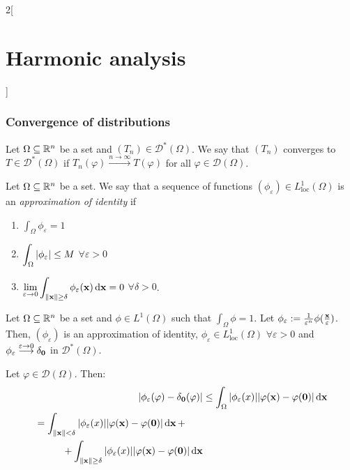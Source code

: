 \documentclass[../../../main_math.tex]{subfiles}
\begin{document}
\begin{multicols}{2}[\section{Harmonic analysis}]
  \subsubsection{Convergence of distributions}
  \begin{definition}
    Let $\Omega\subseteq \mathbb{R}^n$ be a set and $(T_n)\in \mathcal{D}^*(\Omega)$. We say that $(T_n)$ converges to $T\in\mathcal{D}^*(\Omega)$ if $T_n(\varphi)\overset{n\to\infty}{\longrightarrow}T(\varphi)$ for all $\varphi\in\mathcal{D}(\Omega)$.
  \end{definition}
  \begin{definition}
    Let $\Omega\subseteq \mathbb{R}^n$ be a set. We say that a sequence of functions $(\phi_\varepsilon)\in L_\mathrm{loc}^1(\Omega)$ is an \emph{approximation of identity} if
    \begin{enumerate}
      \item $\displaystyle\int_\Omega \phi_\varepsilon=1$
      \item $\displaystyle\int_\Omega \abs{\phi_\varepsilon}\leq M$ $\forall \varepsilon>0$
      \item $\displaystyle\lim_{\varepsilon\to 0}\int_{\left\|\boldsymbol{\mathrm{x}}\right\|\geq \delta}\phi_\varepsilon(\boldsymbol{\mathrm{x}})\dd{\boldsymbol{\mathrm{x}}}=0$ $\forall \delta>0$.
    \end{enumerate}
  \end{definition}
  \begin{proposition}
    Let $\Omega\subseteq \mathbb{R}^n$ be a set and $\phi\in L^1(\Omega)$ such that $\int_\Omega\phi=1$. Let $\phi_\varepsilon:=\frac{1}{\varepsilon^n}\phi(\frac{\boldsymbol{\mathrm{x}}}{\varepsilon})$. Then, $(\phi_\varepsilon)$ is an approximation of identity, $\phi_\varepsilon \in L_\mathrm{loc}^1(\Omega)$ $\forall \varepsilon>0$ and $\phi_\varepsilon\overset{\varepsilon\to 0}{\longrightarrow} \delta_{\boldsymbol{\mathrm{0}}}$ in $\mathcal{D}^*(\Omega)$.
  \end{proposition}
  \begin{sproof}
    Let $\varphi\in\mathcal{D}(\Omega)$. Then:
    \begin{align*}
      \abs{\phi_\varepsilon(\varphi)-\delta_{\vf{0}}(\varphi)} & \leq \int_\Omega \abs{\phi_\varepsilon(x)}\abs{\varphi(\vf{x})-\varphi(\vf{0})}\dd{\vf{x}} \\
      \begin{split}
        & =\int_{\norm{\vf{x}}<\delta} \abs{\phi_\varepsilon(x)}\abs{\varphi(\vf{x})-\varphi(\vf{0})}\dd{\vf{x}}+               \\
        & \hspace{1cm}+\int_{\norm{\vf{x}}\geq\delta} \abs{\phi_\varepsilon(x)}\abs{\varphi(\vf{x})-\varphi(\vf{0})}\dd{\vf{x}}

\end{split}
\end{align*}
\end{sproof}
\end{multicols}
\end{document}
